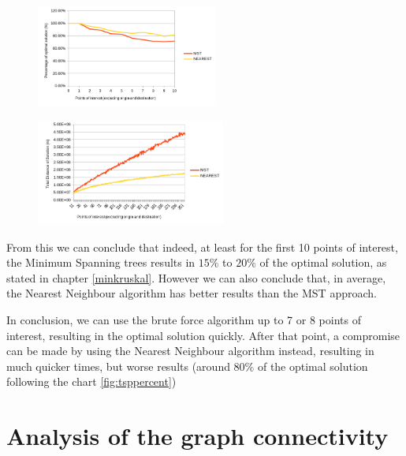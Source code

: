 \documentclass[a4paper, 12pt]{report}
\begin{document}
    \begin{figure}[H]
    \centering
    \begin{minipage}{.47\textwidth}
      \centering
      \includegraphics[width = 225px]{img/tsppercent.png}
      \label{fig:tsppercent}
    \end{minipage}%
    \hspace{.03\textwidth} 
    \begin{minipage}{.47\textwidth}
    \centering
      \includegraphics[width = 235px]{img/tspdistance.png}
      \label{fig:tspdistance}
    \end{minipage}
    \end{figure}
    
    From this we can conclude that indeed, at least for the first 10 points of interest, the Minimum Spanning trees results in $15\%$ to $20\%$ of the optimal solution, as stated in chapter \ref{minkruskal}. However we can also conclude that, in average, the Nearest Neighbour algorithm has better results than the MST approach.
    
    In conclusion, we can use the brute force algorithm up to 7 or 8 points of interest, resulting in the optimal solution quickly. After that point, a compromise can be made by using the Nearest Neighbour algorithm instead, resulting in much quicker times, but worse results (around $80\%$ of the optimal solution following the chart \ref{fig:tsppercent})
    
    \chapter{Analysis of the graph connectivity} \label{chapter:10} %
    
\end{document}

